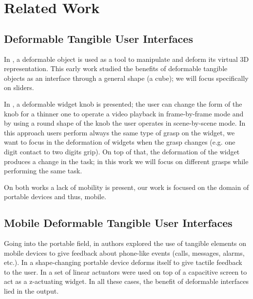\documentclass{sigchi}
\begin{document}
\section{Related Work}

\subsection{Deformable Tangible User Interfaces}
In \cite{Murakami:1995:DDO:223355.223442}, a deformable object is used as a tool to manipulate and deform its virtual 3D representation. This early work studied the benefits of deformable tangible objects as an interface through a general shape (a cube); we will focus specifically on sliders.

In \cite{Michelitsch:2004:HCN:985921.986050}, a deformable widget knob is presented; the user can change the form of the knob for a thinner one to operate a video playback in frame-by-frame mode and by using a round shape of the knob the user operates in scene-by-scene mode. In this approach users perform always the same type of grasp on the widget, we want to focus in the deformation of widgets when the grasp changes (e.g. one digit contact to two digits grip). On top of that, the deformation of the widget produces a change in the task; in this work we will focus on different grasps while performing the same task.

On both works a lack of mobility is present, our work is focused on the domain of portable devices and thus, mobile.

\subsection{Mobile Deformable Tangible User Interfaces}
Going into the portable field, in \cite{Hemmert:2008:DKS:1358628.1358675} authors explored the use of tangible elements on mobile devices to give feedback about phone-like events (calls, messages, alarms, etc.). In \cite{Roudaut:2013:MTH:2470654.2470738,Dimitriadis:2014:EEP:2556288.2557164} a shape-changing portable device deforms itself to give tactile feedback to the user. In \cite{Hardy:2015:STR:2702123.2702599} a set of linear actuators were used on top of a capacitive screen to act as a z-actuating widget. In all these cases, the benefit of deformable interfaces lied in the output.
\end{document}
